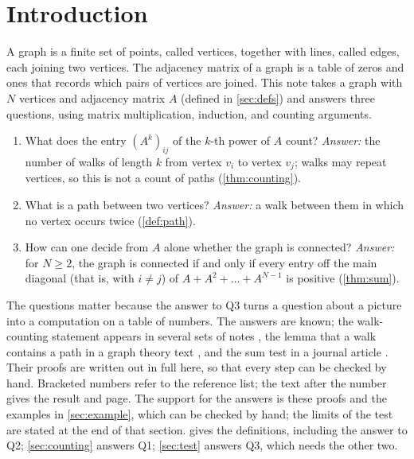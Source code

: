 \section{Introduction}\label{sec:intro}

A graph is a finite set of points, called vertices, together with lines, called edges, each joining two vertices. The adjacency matrix of a graph is a table of zeros and ones that records which pairs of vertices are joined. This note takes a graph with $N$ vertices and adjacency matrix $A$ (defined in \cref{sec:defs}) and answers three questions, using matrix multiplication, induction, and counting arguments.
\begin{enumerate}
\item[(Q1)] What does the entry $(A^k)_{ij}$ of the $k$-th power of $A$ count? \emph{Answer:} the number of walks of length $k$ from vertex $v_i$ to vertex $v_j$; walks may repeat vertices, so this is not a count of paths (\cref{thm:counting}).
\item[(Q2)] What is a path between two vertices? \emph{Answer:} a walk between them in which no vertex occurs twice (\cref{def:path}).
\item[(Q3)] How can one decide from $A$ alone whether the graph is connected? \emph{Answer:} for $N\ge 2$, the graph is connected if and only if every entry off the main diagonal (that is, with $i\ne j$) of $A+A^2+\dots+A^{N-1}$ is positive (\cref{thm:sum}).
\end{enumerate}
The questions matter because the answer to Q3 turns a question about a picture into a computation on a table of numbers. The answers are known; the walk-counting statement appears in several sets of notes \cite{galwaynotes,gotti18211,bai2025adjacency}, the lemma that a walk contains a path in a graph theory text \cite{grinberg2025graph}, and the sum test in a journal article \cite{paramadevan2021adjacency}. Their proofs are written out in full here, so that every step can be checked by hand. Bracketed numbers refer to the reference list; the text after the number gives the result and page. The support for the answers is these proofs and the examples in \cref{sec:example}, which can be checked by hand; the limits of the test are stated at the end of that section.  gives the definitions, including the answer to Q2; \cref{sec:counting} answers Q1; \cref{sec:test} answers Q3, which needs the other two.
